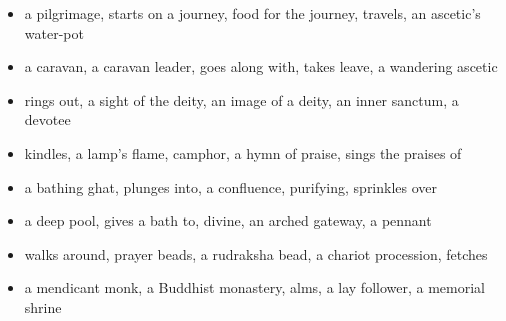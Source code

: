 \begin{itemize}
\raggedright
  \item a pilgrimage, starts on a journey, food for the journey, travels, an ascetic's water-pot
  \item a caravan, a caravan leader, goes along with, takes leave, a wandering ascetic
  \item rings out, a sight of the deity, an image of a deity, an inner sanctum, a devotee
  \item kindles, a lamp's flame, camphor, a hymn of praise, sings the praises of
  \item a bathing ghat, plunges into, a confluence, purifying, sprinkles over
  \item a deep pool, gives a bath to, divine, an arched gateway, a pennant
  \item walks around, prayer beads, a rudraksha bead, a chariot procession, fetches
  \item a mendicant monk, a Buddhist monastery, alms, a lay follower, a memorial shrine
\end{itemize}

